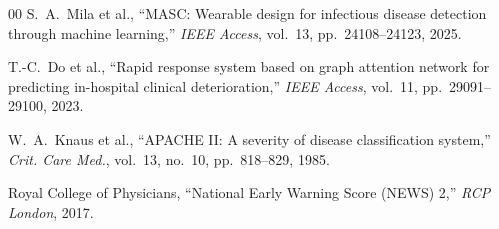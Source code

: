 \documentclass[a4paper,conference]{IEEEtran}
\begin{document}
\begin{thebibliography}{00}
 S.~A.~Mila et al., ``MASC: Wearable design for infectious disease detection through machine learning,'' {\em IEEE Access}, vol.~13, pp.~24108--24123, 2025.

 T.-C.~Do et al., ``Rapid response system based on graph attention network for predicting in-hospital clinical deterioration,'' {\em IEEE Access}, vol.~11, pp.~29091--29100, 2023.

 W.~A.~Knaus et al., ``APACHE II: A severity of disease classification system,'' {\em Crit. Care Med.}, vol.~13, no.~10, pp.~818--829, 1985.

 Royal College of Physicians, ``National Early Warning Score (NEWS) 2,'' {\em RCP London}, 2017.

\end{thebibliography}
\end{document}
